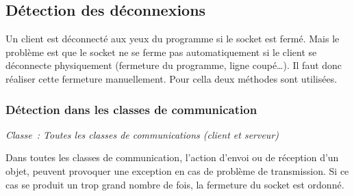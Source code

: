 \documentclass[a4paper, titlepage]{livret}
\begin{document}
  \subsection{Détection des déconnexions}
    Un client est déconnecté aux yeux du programme si le socket est fermé. Mais le problème est que le socket ne se ferme pas automatiquement si le client se déconnecte physiquement (fermeture du programme, ligne coupé…). Il faut donc réaliser cette fermeture manuellement. Pour cella deux méthodes sont utilisées.
    
  \subsubsection{Détection dans les classes de communication}
    \begin{center}
    \textit{Classe : Toutes les classes de communications (client et serveur)}
    \end{center}
      Dans toutes les classes de communication, l’action d’envoi ou de réception d’un objet, peuvent provoquer une exception en cas de problème de transmission. Si ce cas se produit un trop grand nombre de fois, la fermeture du socket est ordonné.
    
\end{document}

